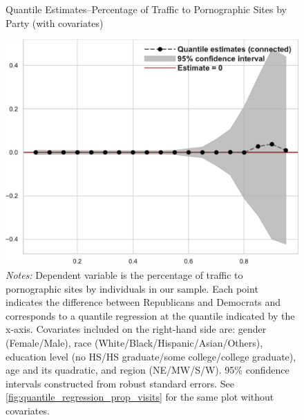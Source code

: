 \documentclass[12pt, letterpaper]{article}
\begin{document}
\begin{figure}
	\centering
	\caption{Quantile Estimates--Percentage of Traffic to Pornographic Sites by Party (with covariates)}
	\includegraphics[width=.55\linewidth]{../figs/quantile_reg_covariates_proportion_visits_adult.pdf}
	\caption*{\footnotesize \emph{Notes:} 
		Dependent variable is the percentage of traffic to pornographic sites by individuals in our sample.
		Each point indicates the difference between Republicans and Democrats and corresponds to a quantile regression at the quantile indicated by the x-axis.
		Covariates included on the right-hand side are: gender (Female/Male), race (White/Black/Hispanic/Asian/Others), education level (no HS/HS graduate/some college/college graduate), age and its quadratic, and region (NE/MW/S/W).
		95\% confidence intervals constructed from robust standard errors.
		See \cref{fig:quantile_regression_prop_visits} for the same plot without covariates.
	}
	\label{fig:quantile_regression_prop_visits_covariates}
\end{figure}
\end{document}
